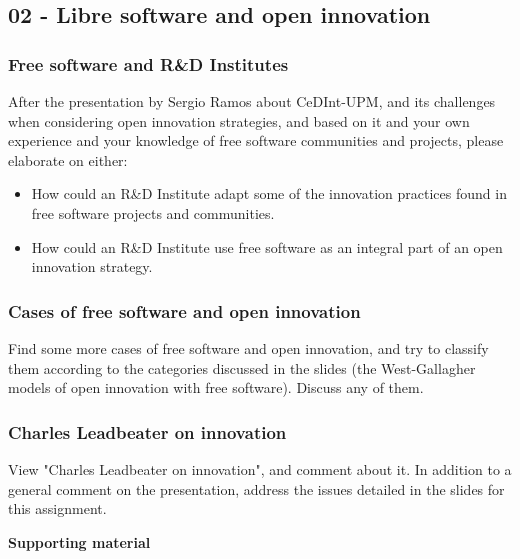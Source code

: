 \documentclass[a4paper]{article}
\begin{document}
\subsection{02 - Libre software and open innovation}

\subsubsection{Free software and R\&D Institutes}
\label{sub:openinnova-rd}

After the presentation by Sergio Ramos about CeDInt-UPM, and its challenges when considering open innovation strategies, and based on it and your own experience and your knowledge of free software communities and projects, please elaborate on either:

\begin{itemize}
\item How could an R\&D Institute adapt some of the innovation practices found in free software projects and communities.
\item How could an R\&D Institute use free software as an integral part of an open innovation strategy.
\end{itemize}


\subsubsection{Cases of free software and open innovation}
\label{sub:openinnova-cases}

Find some more cases of free software and open innovation, and try to classify them according to the categories discussed in the slides (the West-Gallagher models of open innovation with free software). Discuss any of them.


\subsubsection{Charles Leadbeater on innovation}
\label{sub:openinnova-leadbater}

View "Charles Leadbeater on innovation", and comment about it. In addition to a general comment on the presentation, address the issues detailed in the slides for this assignment.

\textbf{Supporting material}
\end{document}
